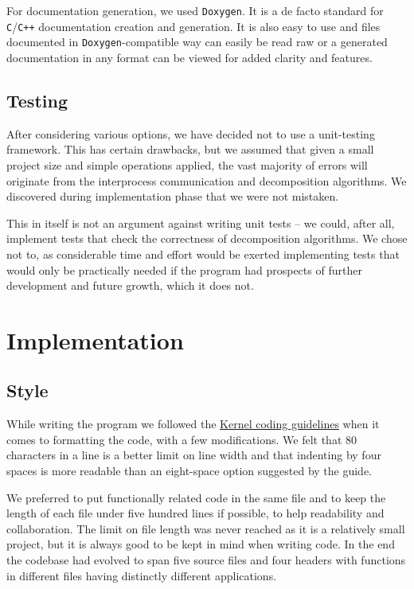 \documentclass[11pt,a4paper]{article}
\begin{document}
For documentation generation, we used \texttt{Doxygen}. 
It is a de facto standard for \texttt{C}/\texttt{C++} documentation creation and generation. 
It is also easy to use and files documented in \texttt{Doxygen}-compatible way can easily be read raw or a generated documentation in any format can be viewed for added clarity and features.

\subsection{Testing}
After considering various options, we have decided not to use a unit-testing framework. 
This has certain drawbacks, but we assumed that given a small project size and simple operations applied, the vast majority of errors will originate from the interprocess communication and decomposition algorithms. 
We discovered during implementation phase that we were not mistaken. 

This in itself is not an argument against writing unit tests -- we could, after all, implement tests that check the correctness of decomposition algorithms.
We chose not to, as considerable time and effort would be exerted implementing tests that would only be practically needed if the program had prospects of further development and future growth, which it does not.

\section{Implementation}
\subsection{Style}
While writing the program we followed the \href{https://www.kernel.org/doc/Documentation/CodingStyle}{Kernel coding guidelines} when it comes to formatting the code, with a few modifications. 
We felt that 80 characters in a line is a better limit on line width and that indenting by four spaces is more readable than an eight-space option suggested by the guide. 

We preferred to put functionally related code in the same file and to keep the length of each file under five hundred lines if possible, to help readability and collaboration. 
The limit on file length was never reached as it is a relatively small project, but it is always good to be kept in mind when writing code.
In the end the codebase had evolved to span five source files and four headers with functions in different files having distinctly different applications.
\end{document}
